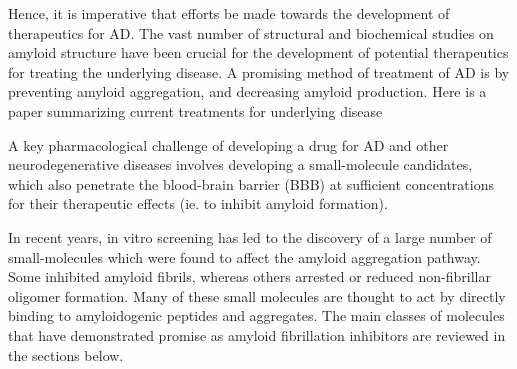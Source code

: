 
Hence, it is imperative that efforts be made towards the development of therapeutics for AD.  The vast number of structural and biochemical studies on amyloid structure have been crucial for the development of potential therapeutics for treating the underlying disease.  A promising method of treatment of AD is by preventing amyloid aggregation, and decreasing amyloid production. Here is a paper summarizing current treatments for underlying disease\cite{Salomone:2012fh}


A key pharmacological challenge of developing a drug for AD and other neurodegenerative diseases involves developing a small-molecule candidates, which also penetrate the blood-brain barrier (BBB) at sufficient concentrations for their therapeutic effects (ie. to inhibit amyloid formation). %

In recent years, in vitro screening has led to the discovery of a large number of small-molecules which were found to affect the amyloid aggregation pathway. Some inhibited amyloid fibrils, whereas others arrested or reduced non-fibrillar oligomer formation. Many of these small molecules are thought to act by directly binding to amyloidogenic peptides and aggregates. The main classes of molecules that have demonstrated promise as amyloid fibrillation inhibitors are reviewed in the sections below.

